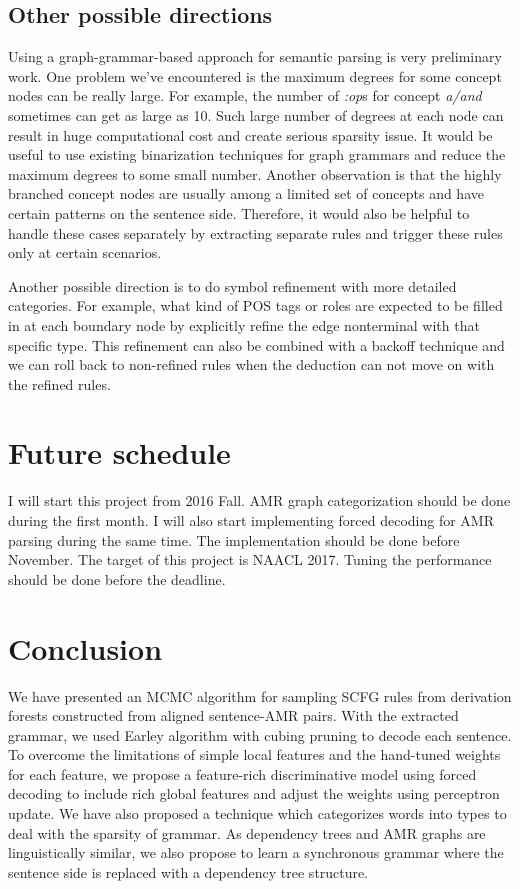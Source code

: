 \subsection{Other possible directions}
Using a graph-grammar-based approach for semantic parsing is very preliminary work. One problem we've encountered is the maximum degrees for some concept nodes
can be really large. For example, the number of \textit{:op}s for concept \textit{a/and} sometimes can get as large as 10. Such large number of degrees at each node can
result in huge computational cost and create serious sparsity issue. It would be useful to use existing binarization techniques for graph grammars and reduce the maximum degrees
to some small number. Another observation is that the highly branched concept nodes are usually among a limited set of concepts and have certain patterns on the sentence side. Therefore, it would also be helpful to
handle these cases separately by extracting separate rules and trigger these rules only at certain scenarios.


Another possible direction is to do symbol refinement with more detailed categories. For example, what kind of POS tags or roles are expected to be filled in at each
boundary node by explicitly refine the edge nonterminal with that specific type. This refinement can also be combined with a backoff technique and we can roll back
to non-refined rules when the deduction can not move on with the refined rules.
\section{Future schedule}
I will start this project from 2016 Fall. AMR graph categorization should be done during the first month. I will also start implementing forced decoding for AMR parsing during the same time.
The implementation should be done before November. The target of this project is NAACL 2017. Tuning the performance should be done before the deadline.
\section{Conclusion}
We have presented an MCMC algorithm for sampling SCFG rules from derivation forests constructed from aligned sentence-AMR pairs.
With the extracted grammar, we used Earley algorithm with cubing pruning to decode each sentence. To overcome the limitations of
simple local features and the hand-tuned weights for each feature, we propose a feature-rich discriminative model using forced decoding to
include rich global features and adjust the weights using perceptron update.
We have also proposed a technique which categorizes words into types to deal with the sparsity of grammar. 
As dependency trees and AMR graphs are linguistically similar, we also propose to learn a synchronous grammar where the sentence side is replaced with a dependency tree structure.
